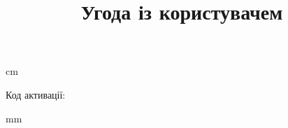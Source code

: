 \documentclass[a4paper]{article}
\title{Угода із користувачем}
\begin{document}
\pagestyle{empty}
 cm
\begin{flushright}
\small Код активації: \texttt{}
\end{flushright}

\pagebreak
{} mm

\end{document}
